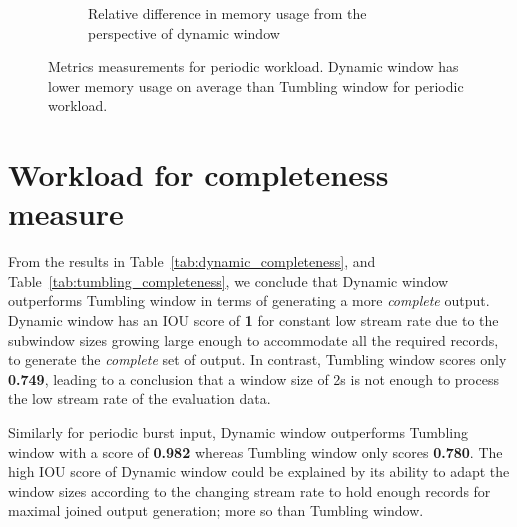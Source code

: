 \begin{figure}
\begin{subfigure}[b]{\columnwidth}
        \caption{Relative difference in memory usage from the perspective of dynamic window}
        \label{fig:periodic_mem_diff}
    \end{subfigure}

    \caption[Metrics measurements for periodic workload]
    {Metrics measurements for periodic workload. Dynamic window 
    has lower memory usage on average than Tumbling window for
periodic workload. }%
    \label{fig:periodic_measurement}
\end{figure}

\newpage
\section{Workload for completeness measure}%
\label{sec:Workload for completeness measure}

From the results in Table~\ref{tab:dynamic_completeness}, and 
Table~\ref{tab:tumbling_completeness}, we conclude that Dynamic window 
outperforms Tumbling window in terms of generating a more \emph{complete} output. 
Dynamic window has an IOU score of \textbf{1} for constant low stream rate
due to the subwindow sizes growing large 
enough to accommodate all the required records, to generate the \emph{complete} set 
of output. In contrast, Tumbling window scores only \textbf{0.749}, leading to 
a conclusion that a window size of 2s is not enough to process the low stream rate 
of the evaluation data. 

Similarly for periodic burst input, Dynamic window outperforms Tumbling window with a
score of \textbf{0.982} whereas Tumbling window only scores \textbf{0.780}. The high IOU 
score of Dynamic window could be explained by its ability to adapt the window sizes according 
to the changing stream rate to hold enough records for maximal joined output generation; more
so than Tumbling window. 


\begin{table}[htbp]
    \centering
\caption{Dynamic window's completeness measurement. The \emph{Expected (triples)} are the number of triples generated by the 
bounded data processing RMLStreamer.}
\label{tab:dynamic_completeness}
\end{table}

